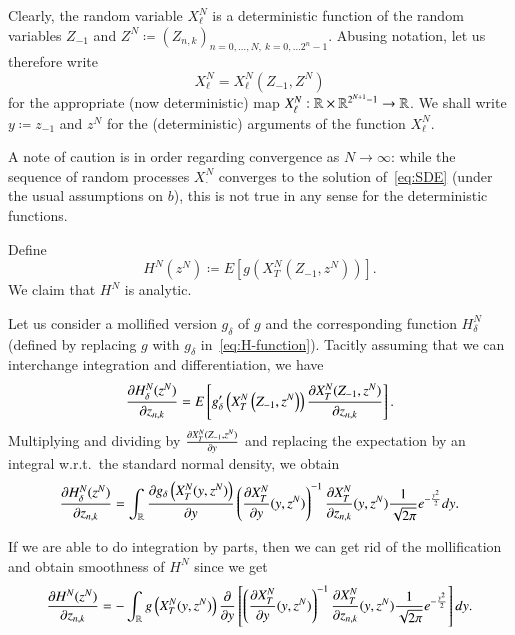 \documentclass{amsart}
\begin{document}
Clearly, the random variable $X^N_\ell$ is a deterministic function of the
random variables $Z_{-1}$ and $Z^N \coloneqq \left(Z_{n,k} \right)_{n=0,
  \ldots, N, \ k=0, \ldots 2^n-1}$. Abusing notation, let us therefore write
\begin{equation*}
  X^N_\ell = X^N_\ell\left(Z_{-1}, Z^N \right)
\end{equation*}
for the appropriate (now deterministic) map $X^N_\ell: \mathbb{R} \times
\mathbb{R}^{2^{N+1}-1} \to \mathbb{R}$. We shall write $y \coloneqq z_{-1}$ and $z^N$ for the
(deterministic) arguments of the function $X^N_\ell$.

A note of caution is in order regarding convergence as $N \to \infty$: while
the sequence of random processes $X^N_\cdot$ converges to the solution
of~\eqref{eq:SDE} (under the usual assumptions on $b$), this is not true in
any sense for the deterministic functions.

Define
\begin{equation}
  \label{eq:H-function}
  H^N(z^N) \coloneqq E\left[ g\left( X^N_T\left( Z_{-1}, z^N \right) \right) \right].
\end{equation}
We claim that $H^N$ is analytic.

Let us consider a mollified version $g_\delta$ of $g$ and the corresponding
function $H^N_\delta$ (defined by replacing $g$ with $g_\delta$
in~\eqref{eq:H-function}). Tacitly assuming that we can interchange
integration and differentiation, we have
\begin{equation*}
  \frac{\partial H^N_\delta(z^N)}{\partial z_{n,k}} = E\left[ g_\delta^\prime\left( X^N_T\left( Z_{-1},
    z^N \right) \right) \frac{\partial X^N_T(Z_{-1}, z^N)}{\partial z_{n,k}}\right].
\end{equation*}
Multiplying and dividing by $\frac{\partial X^N_T(Z_{-1}, z^N)}{\partial y}$ and replacing
the expectation by an integral w.r.t.~the standard normal density, we obtain
\begin{equation}
  \label{eq:1}
  \frac{\partial H^N_\delta(z^N)}{\partial z_{n,k}} = \int_{\mathbb{R}} \frac{\partial g_\delta\left( X^N_T
      (y, z^N) \right)}{\partial y} \left( \frac{\partial X^N_T}{\partial y}(y, z^N)
  \right)^{-1} \frac{\partial X^N_T}{\partial z_{n,k}}(y, z^N) \frac{1}{\sqrt{2\pi}}
  e^{-\frac{y^2}{2}} dy.
\end{equation}

If we are able to do integration by parts, then we can get rid of the
mollification and obtain smoothness of $H^N$ since we get
\begin{equation*}
  \frac{\partial H^N(z^N)}{\partial z_{n,k}} = -\int_{\mathbb{R}} g\left( X^N_T
      (y, z^N) \right) \frac{\partial}{\partial y} \left[ \left( \frac{\partial X^N_T}{\partial y}(y, z^N)
  \right)^{-1} \frac{\partial X^N_T}{\partial z_{n,k}}(y, z^N) \frac{1}{\sqrt{2\pi}}
  e^{-\frac{y^2}{2}}\right] dy.
\end{equation*}
\end{document}
